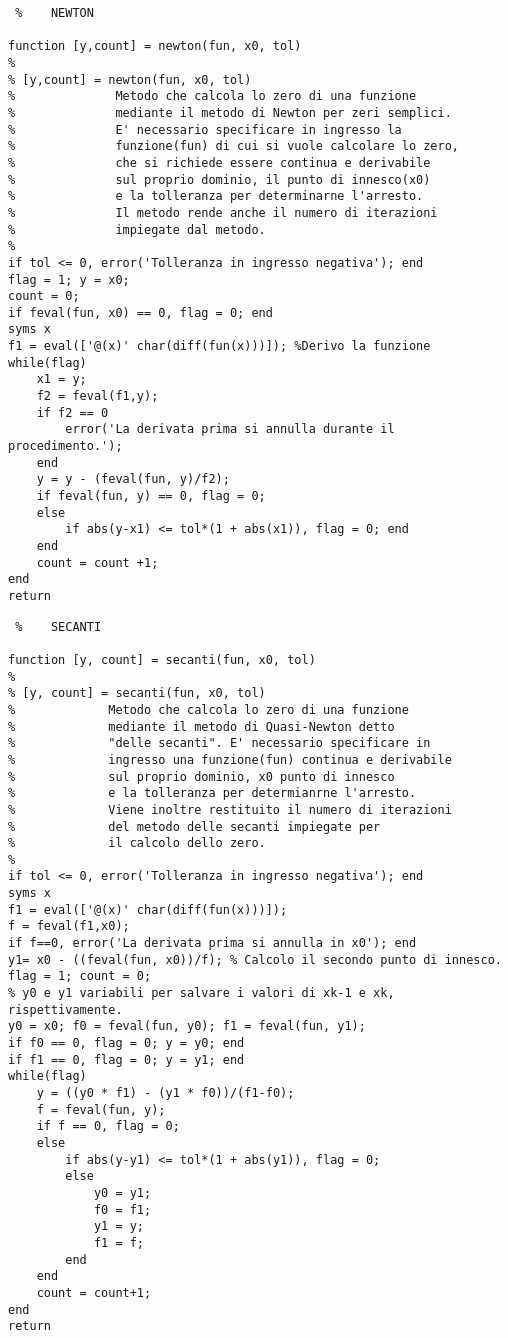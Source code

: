 \documentclass[a4paper]{report}
\begin{document}
\newpage
\begin{lstlisting} % 	NEWTON

function [y,count] = newton(fun, x0, tol)
%
% [y,count] = newton(fun, x0, tol)
%              Metodo che calcola lo zero di una funzione
%              mediante il metodo di Newton per zeri semplici.
%              E' necessario specificare in ingresso la
%              funzione(fun) di cui si vuole calcolare lo zero,
%              che si richiede essere continua e derivabile
%              sul proprio dominio, il punto di innesco(x0)
%              e la tolleranza per determinarne l'arresto.
%              Il metodo rende anche il numero di iterazioni
%              impiegate dal metodo.
%
if tol <= 0, error('Tolleranza in ingresso negativa'); end
flag = 1; y = x0;
count = 0;
if feval(fun, x0) == 0, flag = 0; end
syms x
f1 = eval(['@(x)' char(diff(fun(x)))]); %Derivo la funzione
while(flag)
	x1 = y;
	f2 = feval(f1,y);
	if f2 == 0
		error('La derivata prima si annulla durante il procedimento.');
	end
	y = y - (feval(fun, y)/f2);
	if feval(fun, y) == 0, flag = 0;
	else
		if abs(y-x1) <= tol*(1 + abs(x1)), flag = 0; end
	end
	count = count +1;
end
return
\end{lstlisting}
\newpage
\begin{lstlisting} % 	SECANTI

function [y, count] = secanti(fun, x0, tol)
%
% [y, count] = secanti(fun, x0, tol)
%             Metodo che calcola lo zero di una funzione  
%             mediante il metodo di Quasi-Newton detto 
%             "delle secanti". E' necessario specificare in 
%             ingresso una funzione(fun) continua e derivabile 
%             sul proprio dominio, x0 punto di innesco  
%             e la tolleranza per determianrne l'arresto.
%             Viene inoltre restituito il numero di iterazioni
%             del metodo delle secanti impiegate per 
%             il calcolo dello zero.
%
if tol <= 0, error('Tolleranza in ingresso negativa'); end
syms x
f1 = eval(['@(x)' char(diff(fun(x)))]);
f = feval(f1,x0);
if f==0, error('La derivata prima si annulla in x0'); end
y1= x0 - ((feval(fun, x0))/f); % Calcolo il secondo punto di innesco. 
flag = 1; count = 0;
% y0 e y1 variabili per salvare i valori di xk-1 e xk, rispettivamente.
y0 = x0; f0 = feval(fun, y0); f1 = feval(fun, y1);
if f0 == 0, flag = 0; y = y0; end
if f1 == 0, flag = 0; y = y1; end
while(flag)
	y = ((y0 * f1) - (y1 * f0))/(f1-f0);
	f = feval(fun, y);
	if f == 0, flag = 0;
	else
		if abs(y-y1) <= tol*(1 + abs(y1)), flag = 0;
		else 
			y0 = y1;
			f0 = f1;
			y1 = y;
			f1 = f;
		end
	end
	count = count+1;
end 
return
\end{lstlisting}
\end{document}
